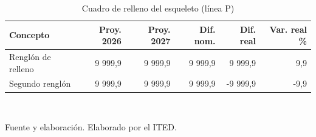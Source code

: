 \begin{table}[htbp]
\centering
\scriptsize
\caption{Cuadro de relleno del esqueleto (línea P)}
\begin{tabular}{p{6.2cm}rrrrr}
\toprule
\textbf{Concepto} & \textbf{Proy. 2026} & \textbf{Proy. 2027} & \textbf{Dif. nom.} & \textbf{Dif. real} & \textbf{Var. real \%} \\
\midrule
Renglón de relleno & 9 999,9 & 9 999,9 & 9 999,9 & 9 999,9 & 9,9 \\
Segundo renglón & 9 999,9 & 9 999,9 & 9 999,9 & -9 999,9 & -9,9 \\
\bottomrule
\end{tabular}
\\[2pt]\begin{minipage}{0.92\textwidth}\scriptsize Fuente y elaboración. Elaborado por el ITED.\end{minipage}
\end{table}
